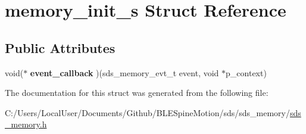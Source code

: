 \hypertarget{structmemory__init__s}{}\section{memory\+\_\+init\+\_\+s Struct Reference}
\label{structmemory__init__s}
\subsection*{Public Attributes}
\begin{DoxyCompactItemize}
\item 
\mbox{\label{structmemory__init__s_a99aa5c71ed825349af6f622ec347a825}} 
void($\ast$ {\bfseries event\+\_\+callback} )(sds\+\_\+memory\+\_\+evt\+\_\+t event, void $\ast$p\+\_\+context)
\end{DoxyCompactItemize}


The documentation for this struct was generated from the following file\+:\begin{DoxyCompactItemize}
\item 
C\+:/\+Users/\+Local\+User/\+Documents/\+Github/\+B\+L\+E\+Spine\+Motion/sds/sds\+\_\+memory/\mbox{\hyperlink{sds__memory_8h}{sds\+\_\+memory.\+h}}\end{DoxyCompactItemize}
